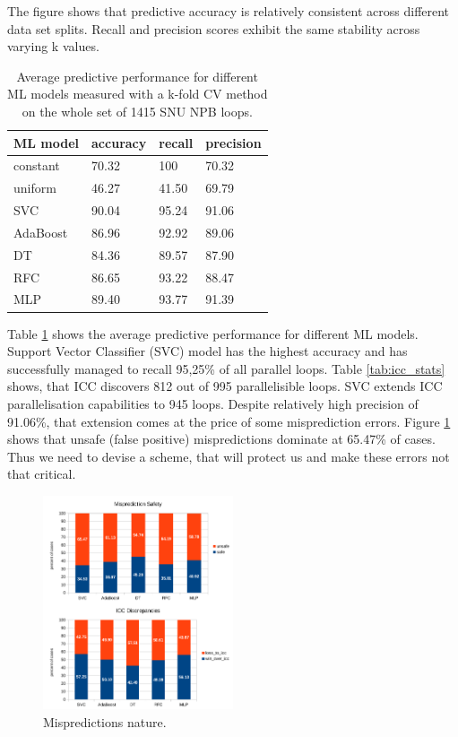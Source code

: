 \documentclass[sigconf,10pt,review,anonymous]{acmart}
\begin{document}
The figure shows that predictive accuracy is relatively consistent across different data set splits. Recall and precision scores exhibit the same stability across varying k values. 

\begin{table}[h!]
    \centering
    \begin{tabular}[c]{|p{1.5cm}|p{1.5cm}|p{1.5cm}|p{1.5cm}|}
        \hline
        ML model & accuracy & recall & precision \\
        \hline
        constant & 70.32 & 100 & 70.32\\
        \hline
        uniform & 46.27 & 41.50 & 69.79\\
        \hline
        SVC & 90.04 & 95.24 & 91.06 \\
        \hline
        AdaBoost & 86.96 & 92.92 & 89.06 \\
        \hline
        DT & 84.36 & 89.57 & 87.90 \\
        \hline
        RFC & 86.65 & 93.22 & 88.47 \\
        \hline
        MLP & 89.40 & 93.77 & 91.39 \\
        \hline
    \end{tabular}
    \caption{Average predictive performance for different ML models measured with a k-fold CV method on the whole set of 1415 SNU NPB loops.}
    \label{tab:average_accuracy}
\end{table}

\quad Table \ref{tab:average_accuracy} shows the average predictive performance for different ML models. Support Vector Classifier (SVC) model has the highest accuracy and has successfully managed to recall 95,25\% of all parallel loops. Table \ref{tab:icc_stats} shows, that ICC discovers 812 out of 995 parallelisible loops. SVC extends ICC parallelisation capabilities to 945 loops. Despite relatively high precision of 91.06\%, that extension comes at the price of some misprediction errors. Figure \ref{fig:prediction_stats} shows that unsafe (false positive) mispredictions dominate at 65.47\% of cases. Thus we need to devise a scheme, that will protect us and make these errors not that critical.

\begin{figure}[h]
\includegraphics[width=0.5\textwidth]{figures/prediction_stats.pdf}
\caption{Mispredictions nature.}
\label{fig:prediction_stats}
\end{figure}
\end{document}
